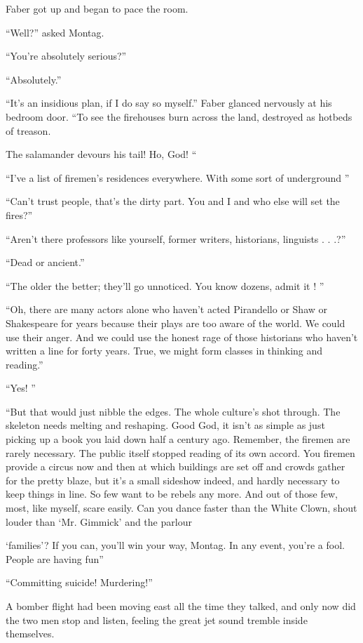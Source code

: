 \documentclass[11pt,openany]{book}
\begin{document}
Faber got up and began to pace the room.

``Well?'' asked Montag.

``You're absolutely serious?''

``Absolutely.''

``It's an insidious plan, if I do say so myself.'' Faber glanced nervously at his bedroom door. ``To see the firehouses burn across the land, destroyed as hotbeds of treason.

The salamander devours his tail! Ho, God! ``

``I've a list of firemen's residences everywhere. With some sort of underground ''

``Can't trust people, that's the dirty part. You and I and who else will set the fires?''

``Aren't there professors like yourself, former writers, historians, linguists . . .?''

``Dead or ancient.''

``The older the better; they'll go unnoticed. You know dozens, admit it ! ''

``Oh, there are many actors alone who haven't acted Pirandello or Shaw or Shakespeare for years because their plays are too aware of the world. We could use their anger. And we could use the honest rage of those historians who haven't written a line for forty years. True, we might form classes in thinking and reading.''

``Yes! ''

``But that would just nibble the edges. The whole culture's shot through. The skeleton needs melting and reshaping. Good God, it isn't as simple as just picking up a book you laid down half a century ago. Remember, the firemen are rarely necessary. The public itself stopped reading of its own accord. You firemen provide a circus now and then at which buildings are set off and crowds gather for the pretty blaze, but it's a small sideshow indeed, and hardly necessary to keep things in line. So few want to be rebels any more. And out of those few, most, like myself, scare easily. Can you dance faster than the White Clown, shout louder than `Mr. Gimmick' and the parlour

`families'? If you can, you'll win your way, Montag. In any event, you're a fool. People are having fun''

``Committing suicide! Murdering!''

A bomber flight had been moving east all the time they talked, and only now did the two men stop and listen, feeling the great jet sound tremble inside themselves.
\end{document}
